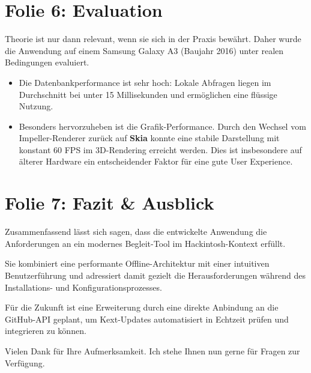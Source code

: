 \documentclass[12pt]{article}
\begin{document}
\section*{Folie 6: Evaluation}
Theorie ist nur dann relevant, wenn sie sich in der Praxis bewährt. Daher wurde die Anwendung auf einem Samsung Galaxy A3 (Baujahr 2016) unter realen Bedingungen evaluiert.

\begin{itemize}
    \item Die Datenbankperformance ist sehr hoch: Lokale Abfragen liegen im Durchschnitt bei unter 15 Millisekunden und ermöglichen eine flüssige Nutzung.

    \item Besonders hervorzuheben ist die Grafik-Performance. Durch den Wechsel vom Impeller-Renderer zurück auf \textbf{Skia} konnte eine stabile Darstellung mit konstant 60 FPS im 3D-Rendering erreicht werden. Dies ist insbesondere auf älterer Hardware ein entscheidender Faktor für eine gute User Experience.
\end{itemize}

\section*{Folie 7: Fazit \& Ausblick}
Zusammenfassend lässt sich sagen, dass die entwickelte Anwendung die Anforderungen an ein modernes Begleit-Tool im Hackintosh-Kontext erfüllt.

Sie kombiniert eine performante Offline-Architektur mit einer intuitiven Benutzerführung und adressiert damit gezielt die Herausforderungen während des Installations- und Konfigurationsprozesses.

Für die Zukunft ist eine Erweiterung durch eine direkte Anbindung an die GitHub-API geplant, um Kext-Updates automatisiert in Echtzeit prüfen und integrieren zu können.

Vielen Dank für Ihre Aufmerksamkeit. Ich stehe Ihnen nun gerne für Fragen zur Verfügung.
\end{document}
